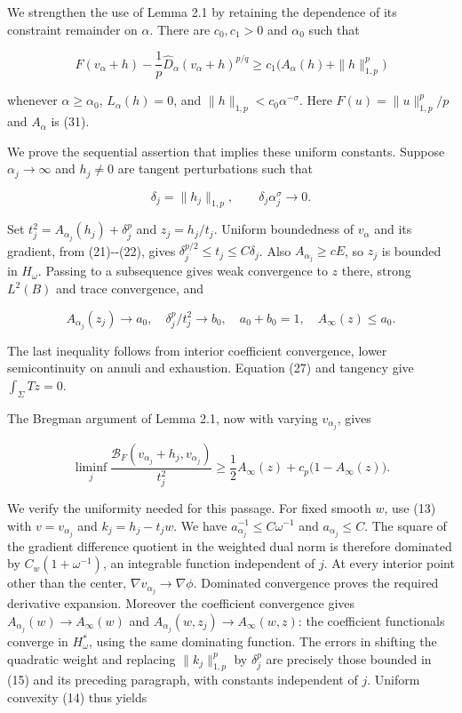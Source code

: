 \documentclass[11pt]{article}
\begin{document}
We strengthen the use of Lemma 2.1 by retaining the dependence of its
constraint remainder on \(\alpha\). There are \(c_0,c_1>0\) and
\(\alpha_0\) such that

\[
F(v_\alpha+h)-\frac1p\widehat D_\alpha(v_\alpha+h)^{p/q}
\ge c_1\bigl(A_\alpha(h)+\|h\|_{1,p}^p\bigr)
\tag{7.8}
\]

whenever \(\alpha\ge\alpha_0\), \(L_\alpha(h)=0\), and
\(\|h\|_{1,p}<c_0\alpha^{-\sigma}\). Here \(F(u)=\|u\|_{1,p}^p/p\) and
\(A_\alpha\) is (31).

We prove the sequential assertion that implies these uniform constants.
Suppose \(\alpha_j\to\infty\) and \(h_j\ne0\) are tangent perturbations
such that

\[
\delta_j=\|h_j\|_{1,p},\qquad
\delta_j\alpha_j^\sigma\longrightarrow0.
\tag{7.9}
\]

Set \(t_j^2=A_{\alpha_j}(h_j)+\delta_j^p\) and \(z_j=h_j/t_j\). Uniform
boundedness of \(v_\alpha\) and its gradient, from (21)-\/-(22), gives
\(\delta_j^{p/2}\le t_j\le C\delta_j\). Also \(A_{\alpha_j}\ge cE\), so
\(z_j\) is bounded in \(H_\omega\). Passing to a subsequence gives weak
convergence to \(z\) there, strong \(L^2(B)\) and trace convergence, and

\[
A_{\alpha_j}(z_j)\to a_0,\quad
\delta_j^p/t_j^2\to b_0,\quad a_0+b_0=1,
\quad A_\infty(z)\le a_0.
\tag{7.10}
\]

The last inequality follows from interior coefficient convergence, lower
semicontinuity on annuli and exhaustion. Equation (27) and tangency give
\(\int_\Sigma Tz=0\).

The Bregman argument of Lemma 2.1, now with varying \(v_{\alpha_j}\),
gives

\[
\liminf_j\frac{\mathcal B_F(v_{\alpha_j}+h_j,v_{\alpha_j})}{t_j^2}
\ge\frac12 A_\infty(z)+c_p\bigl(1-A_\infty(z)\bigr).
\tag{7.11}
\]

We verify the uniformity needed for this passage. For fixed smooth
\(w\), use (13) with \(v=v_{\alpha_j}\) and \(k_j=h_j-t_jw\). We have
\(a_{\alpha_j}^{-1}\le C\omega^{-1}\) and \(a_{\alpha_j}\le C\). The
square of the gradient difference quotient in the weighted dual norm is
therefore dominated by \(C_w(1+\omega^{-1})\), an integrable function
independent of \(j\). At every interior point other than the center,
\(\nabla v_{\alpha_j}\to\nabla\phi\). Dominated convergence proves the
required derivative expansion. Moreover the coefficient convergence
gives \(A_{\alpha_j}(w)\to A_\infty(w)\) and
\(A_{\alpha_j}(w,z_j)\to A_\infty(w,z)\): the coefficient functionals
converge in \(H_\omega^*\), using the same dominating function. The
errors in shifting the quadratic weight and replacing
\(\|k_j\|_{1,p}^p\) by \(\delta_j^p\) are precisely those bounded in
(15) and its preceding paragraph, with constants independent of \(j\).
Uniform convexity (14) thus yields
\end{document}
